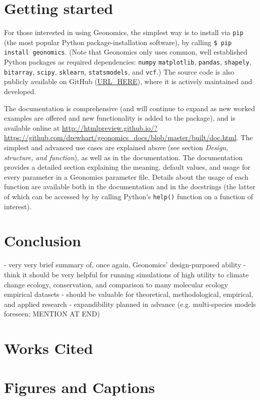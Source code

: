 ﻿\documentclass{article}
\begin{document}
\section{Getting started}
For those interested in using Geonomics, the simplest way is to install
via \texttt{pip} (the most popular Python package-installation software),
by calling \texttt{\$ pip install geonomics}.
(Note that Geonomics only uses common, well established Python packages
as required dependencies: \texttt{numpy} \texttt{matplotlib},
\texttt{pandas}, \texttt{shapely}, \texttt{bitarray},
\texttt{scipy}, \texttt{sklearn}, \texttt{statsmodels}, and \texttt{vcf}.)
The source code is also publicly available on GitHub (\url{URL\_HERE}),
where it is actively maintained and developed.

The documentation is comprehensive (and will continue to expand as new worked examples
are offered and new functionality is added to the package), and is available
online at \url{http://htmlpreview.github.io/?https://github.com/drewhart/geonomics\_docs/blob/master/built/doc.html}.  
The simplest and advanced use cases are explained above (see section
\emph{Design, structure, and function}), as well as in the documentation.
The documentation provides a detailed section explaining the meaning,
default values, and usage for every parameter in a Geonomics parameter file.
Details about the usage of each function are available both in the documentation
and in the docstrings (the latter of which can be accessed by by calling Python's
\texttt{help()} function on a function of interest).


\section {Conclusion}
- very very brief summary of, once again, Geonomics' design-purposed ability
- think it should be very helpful for running simulations of high utility to
  climate change ecology, conservation, and comparison to many molecular ecology
  empirical datasets
- should be valuable for theoretical, methodological, empirical, and applied research
- expandibility planned in advance (e.g. multi-species models foreseen; MENTION AT END)


\section{Works Cited}




\section{Figures and Captions}
\end{document}
